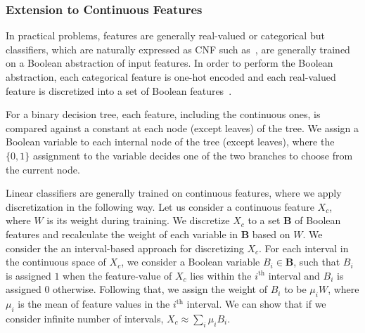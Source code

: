 \subsubsection{Extension to Continuous Features}
In practical problems, features are generally real-valued or categorical but classifiers, which are naturally expressed as CNF such as~\cite{GMM20}, are generally trained on a Boolean abstraction of input features. In order to perform the Boolean abstraction, each categorical feature is one-hot encoded and each real-valued feature is discretized into a set of Boolean features~\cite{LKCL2019,GMM20}. 

For a binary decision tree, each feature, including the continuous ones, is compared against a constant at each node (except leaves) of the tree. We assign a Boolean variable to each internal node of the tree (except leaves), where the $ \{0,1\} $ assignment to the variable decides one of the two branches to choose from the current node.  

Linear classifiers are generally trained on continuous features, where we apply discretization in the following way. Let us consider a continuous feature $X_c$, where $W$ is its weight during training. We discretize $ X_c $ to a set $ \mathbf{B} $ of Boolean features and recalculate the weight of each variable in $ \mathbf{B} $ based on $ W $. We consider the an interval-based approach for discretizing $ X_c $. For each interval in the continuous space of $X_c$, we consider a Boolean variable $B_i \in \mathbf{B}$, such that $ B_i $ is assigned $ 1 $ when the feature-value of $X_c$ lies within the $i^{\mathrm{th}}$ interval and $ B_i $ is assigned $ 0 $ otherwise. Following that, we assign the weight of $ B_i $ to be $ \mu_iW $, where $ \mu_i $ is the mean of feature values in the $i^{\mathrm{th}}$ interval. We can show that if we consider infinite number of intervals, $ X_c \approx \sum_i \mu_i B_i $. 



